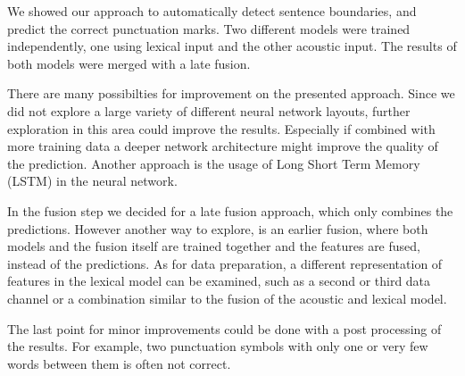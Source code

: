 We showed our approach to automatically detect sentence boundaries, and predict the correct punctuation marks.
Two different models were trained independently, one using lexical input and the other acoustic input.
The results of both models were merged with a late fusion.

There are many possibilties for improvement on the presented approach.
Since we did not explore a large variety of different neural network layouts, further exploration in this area could improve the results.
Especially if combined with more training data a deeper network architecture might improve the quality of the prediction.
Another approach is the usage of Long Short Term Memory (LSTM) in the neural network.

In the fusion step we decided for a late fusion approach, which only combines the predictions.
However another way to explore, is an earlier fusion, where both models and the fusion itself are trained together and the features are fused, instead of the predictions.
As for data preparation, a different representation of features in the lexical model can be examined, such as a second or third data channel or a combination similar to the fusion of the acoustic and lexical model.

The last point for minor improvements could be done with a post processing of the results.
For example, two punctuation symbols with only one or very few words between them is often not correct.
